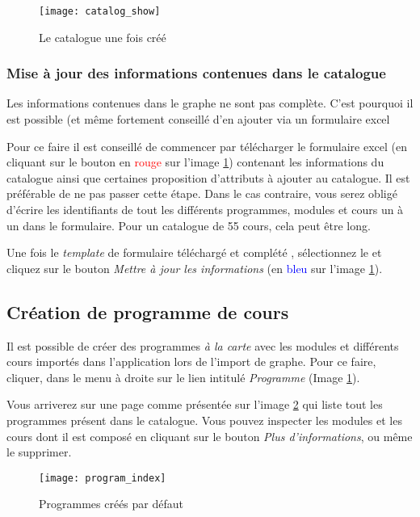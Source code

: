 \begin{figure}[H]
\centering

\caption{Le catalogue une fois créé}
\label{fig:catalog_show}
\texttt{[image: catalog\_show]}
\end{figure}

\subsubsection{Mise à jour des informations contenues dans le catalogue}
Les informations contenues dans le graphe ne sont pas complète. C'est pourquoi il est possible (et même fortement conseillé d'en ajouter via un formulaire excel

Pour ce faire il est conseillé  de commencer par télécharger le formulaire excel (en cliquant sur le bouton en \textcolor{red}{rouge} sur l'image \ref{fig:catalog_show}) contenant les informations du catalogue ainsi que certaines proposition d'attributs à ajouter au catalogue. Il est préférable de ne pas passer cette étape. Dans le cas contraire, vous serez obligé d'écrire les identifiants de tout les différents programmes, modules et cours un à un dans le formulaire. Pour un catalogue de 55 cours, cela peut être long. 

Une fois le \textit{template} de formulaire téléchargé et complété , sélectionnez le et cliquez sur le bouton \textit{Mettre à jour les informations} (en \textcolor{blue}{bleu} sur l'image \ref{fig:catalog_show}).

\subsection{Création de programme de cours}

Il est possible de créer des programmes \textit{à la carte} avec les modules et différents cours importés dans l'application lors de l'import de graphe. Pour ce faire, cliquer, dans le menu à droite sur le lien intitulé \textit{Programme} (Image \ref{fig:catalog_show}).

Vous arriverez sur une page comme présentée sur l'image \ref{fig:program_index} qui liste tout les programmes présent dans le catalogue. Vous pouvez inspecter les modules et les cours dont il est composé en cliquant sur le bouton \textit{Plus d'informations}, ou même le supprimer.

\begin{figure}[H]
\centering
\caption{Programmes créés par défaut}
\label{fig:program_index}
\texttt{[image: program\_index]}

\end{figure}


